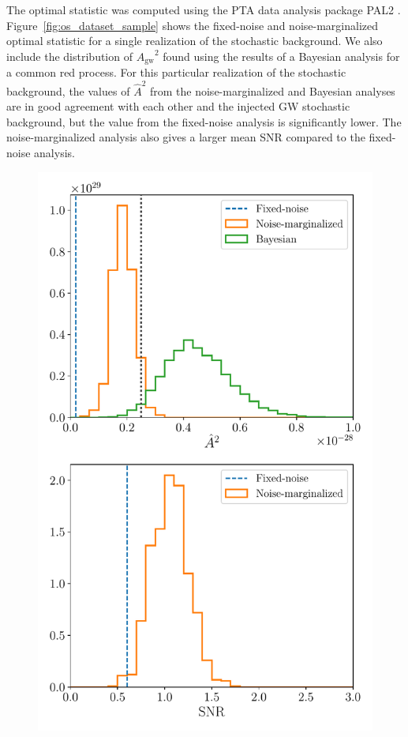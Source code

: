 \documentclass[twocolumn,aps,prd,superscriptaddress]{revtex4-1}
\newcommand{\Agw}{\ensuremath{A_\mathrm{gw}}}
\begin{document}
The optimal statistic was computed using the PTA data analysis package 
PAL2 %
\citep{evh17a}. 
Figure~\ref{fig:os_dataset_sample} shows the fixed-noise and noise-marginalized 
optimal statistic for a single realization of the stochastic background. 
We also include the distribution of $\Agw^2$ found using the results of a Bayesian analysis 
for a common red process. For this particular realization of the stochastic background, 
the values of $\hat{A}^2$ from the noise-marginalized and Bayesian analyses are in good agreement 
with each other and the injected GW stochastic background, 
but the value from the fixed-noise analysis is significantly lower. 
The noise-marginalized analysis also gives a larger mean SNR compared to the fixed-noise analysis.
\begin{figure}[ht]
	\includegraphics[width=0.9\columnwidth]{plots/os_dataset50.pdf}

\end{figure}
\end{document}
